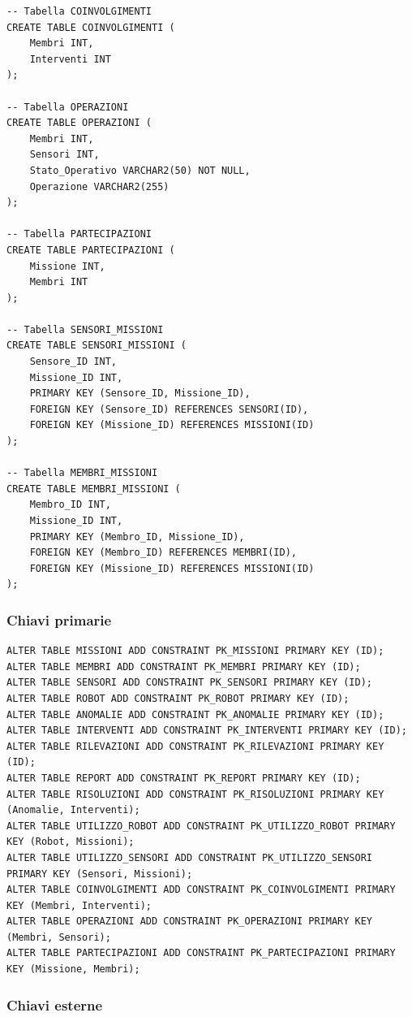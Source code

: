 \begin{lstlisting}
-- Tabella COINVOLGIMENTI
CREATE TABLE COINVOLGIMENTI (
    Membri INT,
    Interventi INT
);

-- Tabella OPERAZIONI
CREATE TABLE OPERAZIONI (
    Membri INT,
    Sensori INT,
    Stato_Operativo VARCHAR2(50) NOT NULL,
    Operazione VARCHAR2(255)
);

-- Tabella PARTECIPAZIONI
CREATE TABLE PARTECIPAZIONI (
    Missione INT,
    Membri INT
);

-- Tabella SENSORI_MISSIONI
CREATE TABLE SENSORI_MISSIONI (
    Sensore_ID INT,
    Missione_ID INT,
    PRIMARY KEY (Sensore_ID, Missione_ID),
    FOREIGN KEY (Sensore_ID) REFERENCES SENSORI(ID),
    FOREIGN KEY (Missione_ID) REFERENCES MISSIONI(ID)
);

-- Tabella MEMBRI_MISSIONI
CREATE TABLE MEMBRI_MISSIONI (
    Membro_ID INT,
    Missione_ID INT,
    PRIMARY KEY (Membro_ID, Missione_ID),
    FOREIGN KEY (Membro_ID) REFERENCES MEMBRI(ID),
    FOREIGN KEY (Missione_ID) REFERENCES MISSIONI(ID)
);
\end{lstlisting}

\subsubsection{Chiavi primarie}

\begin{lstlisting}
ALTER TABLE MISSIONI ADD CONSTRAINT PK_MISSIONI PRIMARY KEY (ID);
ALTER TABLE MEMBRI ADD CONSTRAINT PK_MEMBRI PRIMARY KEY (ID);
ALTER TABLE SENSORI ADD CONSTRAINT PK_SENSORI PRIMARY KEY (ID);
ALTER TABLE ROBOT ADD CONSTRAINT PK_ROBOT PRIMARY KEY (ID);
ALTER TABLE ANOMALIE ADD CONSTRAINT PK_ANOMALIE PRIMARY KEY (ID);
ALTER TABLE INTERVENTI ADD CONSTRAINT PK_INTERVENTI PRIMARY KEY (ID);
ALTER TABLE RILEVAZIONI ADD CONSTRAINT PK_RILEVAZIONI PRIMARY KEY (ID);
ALTER TABLE REPORT ADD CONSTRAINT PK_REPORT PRIMARY KEY (ID);
ALTER TABLE RISOLUZIONI ADD CONSTRAINT PK_RISOLUZIONI PRIMARY KEY (Anomalie, Interventi);
ALTER TABLE UTILIZZO_ROBOT ADD CONSTRAINT PK_UTILIZZO_ROBOT PRIMARY KEY (Robot, Missioni);
ALTER TABLE UTILIZZO_SENSORI ADD CONSTRAINT PK_UTILIZZO_SENSORI PRIMARY KEY (Sensori, Missioni);
ALTER TABLE COINVOLGIMENTI ADD CONSTRAINT PK_COINVOLGIMENTI PRIMARY KEY (Membri, Interventi);
ALTER TABLE OPERAZIONI ADD CONSTRAINT PK_OPERAZIONI PRIMARY KEY (Membri, Sensori);
ALTER TABLE PARTECIPAZIONI ADD CONSTRAINT PK_PARTECIPAZIONI PRIMARY KEY (Missione, Membri);
\end{lstlisting}

\subsubsection{Chiavi esterne}

